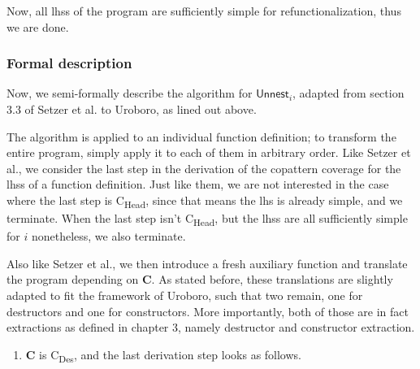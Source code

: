 Now, all lhss of the program are sufficiently simple for refunctionalization, thus we are done.

\subsubsection{Formal description}

Now, we semi-formally describe the algorithm for $\textsf{Unnest}_i$, adapted from section 3.3 of Setzer et al.\cite{setzer14unnesting} to Uroboro, as lined out above.

\begin{algorithm}

The algorithm is applied to an individual function definition; to transform the entire program, simply apply it to each of them in arbitrary order. Like Setzer et al., we consider the last step in the derivation of the copattern coverage for the lhss of a function definition. Just like them, we are not interested in the case where the last step is C\textsubscript{Head}, since that means the lhs is already simple, and we terminate. When the last step isn't C\textsubscript{Head}, but the lhss are all sufficiently simple for $i$ nonetheless, we also terminate.

\begin{prooftree}
\end{prooftree}

Also like Setzer et al., we then introduce a fresh auxiliary function and translate the program depending on \textbf{C}. As stated before, these translations are slightly adapted to fit the framework of Uroboro, such that two remain, one for destructors and one for constructors. More importantly, both of those are in fact extractions as defined in chapter 3, namely destructor and constructor extraction. 

\begin{enumerate}
\item \textbf{C} is C\textsubscript{Des}, and the last derivation step looks as follows.

\begin{prooftree}
\end{prooftree}


\end{enumerate}
\end{algorithm}
